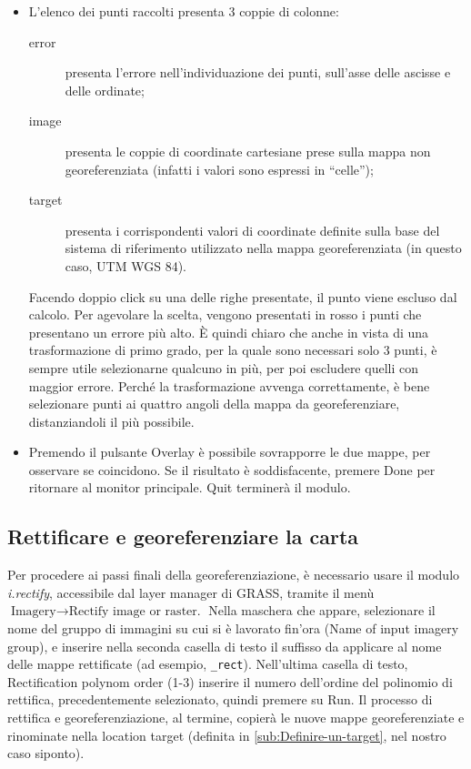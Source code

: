 			
			
			\begin{itemize}
				\item L'elenco dei punti raccolti presenta 3 coppie di colonne:

				\begin{description}
					\item [{\textsf{error}}] presenta l'errore nell'individuazione dei punti, sull'asse delle ascisse e delle ordinate;
					\item [{\textsf{image}}] presenta le coppie di coordinate cartesiane prese sulla mappa non georeferenziata (infatti i valori sono espressi in ``celle'');
					\item [{\textsf{target}}] presenta i corrispondenti valori di coordinate definite sulla base del sistema di riferimento utilizzato nella mappa georeferenziata (in questo caso, UTM WGS 84).
				\end{description}
				
				Facendo doppio click su una delle righe presentate, il punto viene escluso dal calcolo. Per agevolare la scelta, vengono presentati in rosso i punti che presentano un errore più alto. È quindi chiaro che anche in vista di una trasformazione di primo grado, per la quale sono necessari solo 3 punti, è sempre utile selezionarne qualcuno in più, per poi escludere quelli con maggior errore. Perché la trasformazione avvenga correttamente, è bene selezionare punti ai quattro angoli della mappa da georeferenziare, distanziandoli il più possibile.

				\item Premendo il pulsante \textsf{Overlay} è possibile sovrapporre le due mappe, per osservare se coincidono. Se il risultato è soddisfacente, premere \textsf{Done} per ritornare al monitor principale. \textsf{Quit} terminerà il modulo.
			\end{itemize}

	\subsection{Rettificare e georeferenziare la carta}
		Per procedere ai passi finali della georeferenziazione, è necessario usare il modulo \emph{i.rectify}, accessibile dal layer manager di GRASS, tramite il menù \textsf{$\text{Imagery}\rightarrow \text{Rectify image or raster.}$} Nella maschera che appare, selezionare il nome del gruppo di immagini su cui si è lavorato fin'ora (\textsf{Name of input imagery group}), e inserire nella seconda casella di testo il suffisso da applicare al nome delle mappe rettificate (ad esempio, \texttt{\_rect}). Nell'ultima casella di testo, \textsf{Rectification polynom order (1-3)} inserire il numero dell'ordine del polinomio di rettifica, precedentemente selezionato, quindi premere su \textsf{Run}. Il processo di rettifica e georeferenziazione, al termine, copierà le nuove mappe georeferenziate e rinominate nella location target (definita in \textsection\ref{sub:Definire-un-target}, nel nostro caso \textsf{siponto}).

